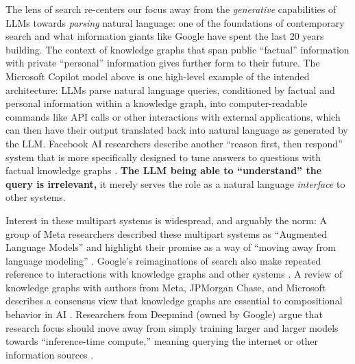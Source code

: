 The lens of search re-centers our focus away from the \emph{generative}
capabilities of LLMs towards \emph{parsing} natural language: one of the
foundations of contemporary search and what information giants like
Google have spent the last 20 years building. The context of knowledge
graphs that span public ``factual'' information with private
``personal'' information gives further form to their future. The
Microsoft Copilot model above is one high-level example of the intended
architecture: LLMs parse natural language queries, conditioned by
factual and personal information within a knowledge graph, into
computer-readable commands like API calls or other interactions with
external applications, which can then have their output translated back
into natural language as generated by the LLM. Facebook AI researchers
describe another ``reason first, then respond'' system that is more
specifically designed to tune answers to questions with factual
knowledge graphs \cite{adolphsReasonFirstThen2021} . \textbf{The
LLM being able to ``understand'' the query is irrelevant,} it merely
serves the role as a natural language \emph{interface} to other systems.

Interest in these multipart systems is widespread, and arguably the
norm: A group of Meta researchers described these multipart systems as
``Augmented Language Models'' and highlight their promise as a way of
``moving away from language modeling'' \cite{mialonAugmentedLanguageModels2023} . Google's reimaginations of
search also make repeated reference to interactions with knowledge
graphs and other systems \cite{metzlerRethinkingSearchMaking2021} . A review of knowledge graphs with authors from Meta, JPMorgan
Chase, and Microsoft describes a consensus view that knowledge graphs
are essential to compositional behavior in AI \cite{chaudhriKnowledgeGraphsIntroduction2022} . Researchers from Deepmind
(owned by Google) argue that research focus should move away from simply
training larger and larger models towards ``inference-time compute,''
meaning querying the internet or other information sources \cite{lazaridouInternetaugmentedLanguageModels2022} .

